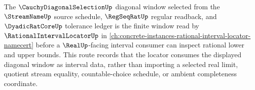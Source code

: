 The $\CauchyDiagonalSelectionUp$ diagonal window selected from the $\StreamNameUp$ source schedule, $\RegSeqRatUp$ regular readback, and $\DyadicRatCoreUp$ tolerance ledger is the finite window read by $\RationalIntervalLocatorUp$ in \autoref{ch:concrete-instances-rational-interval-locator-namecert} before a $\RealUp$-facing interval consumer can inspect rational lower and upper bounds. This route records that the locator consumes the displayed diagonal window as interval data, rather than importing a selected real limit, quotient stream equality, countable-choice schedule, or ambient completeness coordinate.
